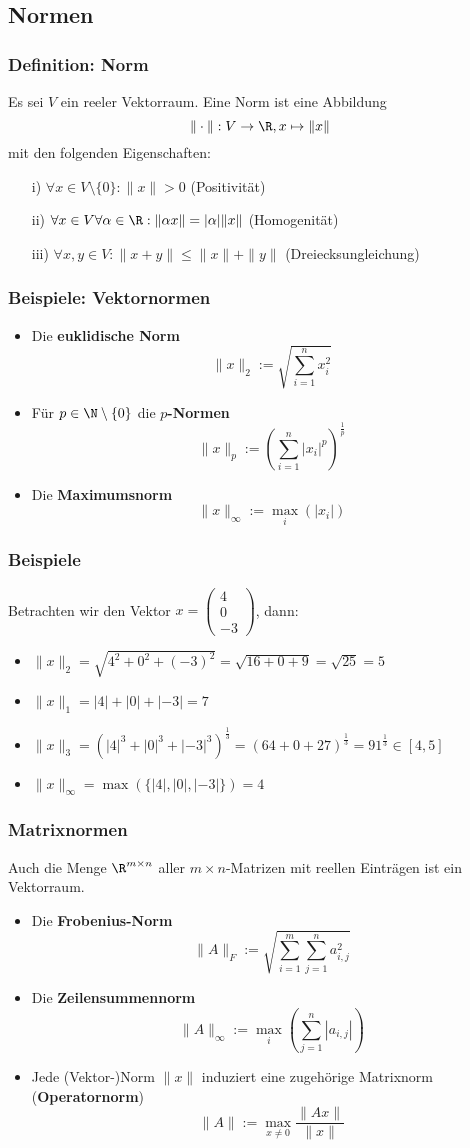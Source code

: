 \subsection{Normen}
%
\begin{frame}\frametitle{Definition: Norm}
Es sei $V$ ein reeler Vektorraum. Eine Norm ist eine Abbildung
$$
\|\cdot\|:V \to \R, x \mapsto \|x\|
$$
mit den folgenden Eigenschaften:
\begin{itemize}
\item[i)] $\forall x \in V\setminus\{0\}: \|x\|>0$ \hfill (Positivität)
\item[ii)] $\forall x \in V \forall \alpha \in \R: \|\alpha x\|=|\alpha| \|x\|$ \hfill (Homogenität)
\item[iii)]$\forall x,y \in V: \|x+y\| \le \|x\|+\|y\|$ \hfill (Dreiecksungleichung) 
\end{itemize}
\end{frame}
%
\begin{frame}\frametitle{Beispiele: Vektornormen}
\begin{itemize}
\item Die \textbf{euklidische Norm} 
$$
\|x\|_2:= \sqrt{\sum_{i=1}^n x_i^2}
$$\pause
\item Für $p\in \N \setminus\{0\}$ die \textbf{$p$-Normen} 
$$
\|x\|_p:= \left(\sum_{i=1}^n |x_i|^p\right)^\frac{1}{p}
$$\pause
\item Die \textbf{Maximumsnorm}
$$
\|x\|_\infty:= \max_i(|x_i|)
$$
\end{itemize}
\end{frame}
%
\begin{frame}\frametitle{Beispiele}
Betrachten wir den Vektor $x=\begin{pmatrix}4\\0\\-3 \end{pmatrix}$, dann:\\
\vfill
\begin{itemize}
\item $\|x\|_2=\sqrt{4^2+0^2+(-3)^2}=\sqrt{16+0+9}=\sqrt{25}=5$\vfill\pause
\item $\|x\|_1= |4|+|0|+|-3|=7$\vfill \pause
\item $\|x\|_3= (|4|^3+|0|^3+|-3|^3)^\frac{1}{3}=(64+0+27)^\frac{1}{3}=91^\frac{1}{3}\in [4,5]$\vfill\pause
\item $\|x\|_\infty = \max(\{|4|,|0|,|-3|\})=4 $
\end{itemize}
\end{frame}
%
%
\begin{frame}\frametitle{Matrixnormen}
Auch die Menge $\R^{m\times n}$ aller $m\times n$-Matrizen mit reellen Einträgen ist ein Vektorraum.
\begin{itemize}
\item Die \textbf{Frobenius-Norm} 
$$
\|A\|_F:= \sqrt{\sum_{i=1}^m\sum_{j=1}^n a_{i,j}^2}
$$\pause
\item Die \textbf{Zeilensummennorm}
$$
\|A\|_\infty:= \max_{i}(\sum_{j=1}^n |a_{i,j}|)
$$\pause
\item Jede (Vektor-)Norm $\|x\|$ induziert eine zugehörige Matrixnorm (\textbf{Operatornorm})
$$
\|A\|:=\max_{x\ne 0}\frac{\|Ax\|}{\|x\|}
$$
\end{itemize}
\end{frame}

